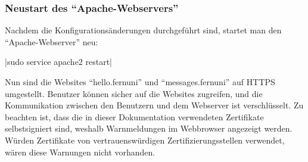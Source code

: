 \subsubsection*{Neustart des \enquote{Apache-Webservers}}
Nachdem die Konfigurationsänderungen durchgeführt sind, startet man den \enquote{Apache-Webserver} neu:

|sudo service apache2 restart|

Nun sind die Websites \enquote{hello.fernuni} und \enquote{messages.fernuni} auf HTTPS umgestellt. Benutzer können sicher auf die Websites zugreifen, und die Kommunikation zwischen den Benutzern und dem Webserver ist verschlüsselt.
Zu beachten ist, dass die in dieser Dokumentation verwendeten Zertifikate selbstsigniert sind, weshalb Warnmeldungen im Webbrowser angezeigt werden. Würden Zertifikate von vertrauenswürdigen Zertifizierungsstellen verwendet, wären diese Warnungen nicht vorhanden.
